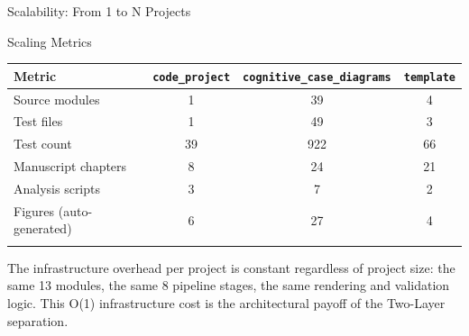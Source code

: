 \documentclass[
  ignorenonframetext,
]{beamer}
\newcounter{none} %
\begin{document}
\begin{frame}[fragile]{Scalability: From 1 to N Projects}
\begin{block}{Scaling Metrics}
\protect{}\label{scaling-metrics}
{\def\LTcaptype{none} %
\begin{longtable}[]{@{}lccc@{}}
\toprule\noalign{}
Metric & \texttt{code\_project} & \texttt{cognitive\_case\_diagrams} &
\texttt{template} \\
\midrule\noalign{}
\endhead
Source modules & 1 & 39 & 4 \\
Test files & 1 & 49 & 3 \\
Test count & 39 & 922 & 66 \\
Manuscript chapters & 8 & 24 & 21 \\
Analysis scripts & 3 & 7 & 2 \\
Figures (auto-generated) & 6 & 27 & 4 \\
\bottomrule\noalign{}
\end{longtable}
}

The infrastructure overhead per project is constant regardless of
project size: the same 13 modules, the same 8 pipeline stages, the same
rendering and validation logic. This O(1) infrastructure cost is the
architectural payoff of the Two-Layer separation.
\end{block}
\end{frame}
\end{document}
